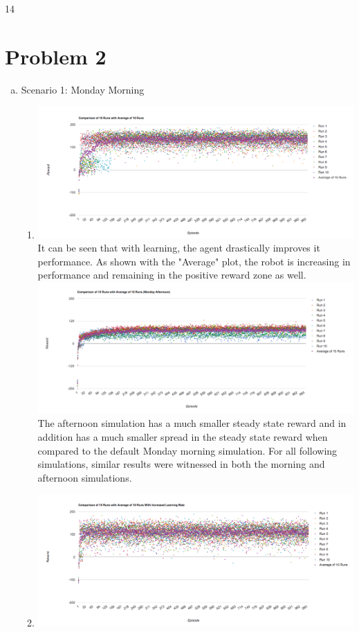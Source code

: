 14\documentclass[12pt]{article}%
\begin{document}
\section*{Problem 2}
    \begin{enumerate}[a)]
        \item Scenario 1: Monday Morning
            \begin{enumerate}[i]
                \item \includegraphics[scale=.25]{regular} \\
                It can be seen that with learning, the agent drastically improves it performance. As shown with the "Average" plot, the robot is increasing in performance and remaining in the positive reward zone as well.\\
                \includegraphics[scale=.25]{mmafter}\\
                The afternoon simulation has a much smaller steady state reward and in addition has a much smaller spread in the steady state reward when compared to the default Monday morning simulation. For all following simulations, similar results were witnessed in both the morning and afternoon simulations.
                \item \includegraphics[scale=.25]{increased_rate} \\

\end{enumerate}
\end{enumerate}
\end{document}
